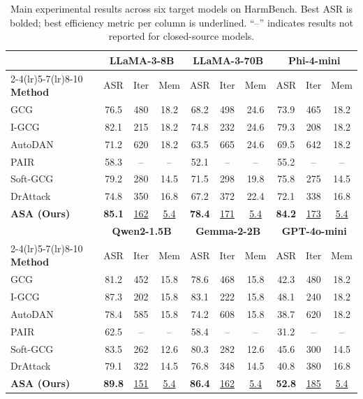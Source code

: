 ﻿\documentclass[lettersize,journal]{IEEEtran}
\begin{document}
\begin{table}[t]
\centering
\caption{Main experimental results across six target models on HarmBench. Best ASR is bolded; best efficiency metric per column is underlined. ``--'' indicates results not reported for closed-source models.}
\label{tab:main_results}
\begin{tabular}{l ccc ccc ccc}
\toprule
& \multicolumn{3}{c}{\textbf{LLaMA-3-8B}} & \multicolumn{3}{c}{\textbf{LLaMA-3-70B}} & \multicolumn{3}{c}{\textbf{Phi-4-mini}} \\
\cmidrule(lr){2-4}\cmidrule(lr){5-7}\cmidrule(lr){8-10}
\textbf{Method} & ASR & Iter & Mem & ASR & Iter & Mem & ASR & Iter & Mem \\
\midrule
GCG & 76.5 & 480 & 18.2 & 68.2 & 498 & 24.6 & 73.9 & 465 & 18.2 \\
I-GCG & 82.1 & 215 & 18.2 & 74.8 & 232 & 24.6 & 79.3 & 208 & 18.2 \\
AutoDAN & 71.2 & 620 & 18.2 & 63.5 & 665 & 24.6 & 69.5 & 642 & 18.2 \\
PAIR & 58.3 & -- & -- & 52.1 & -- & -- & 55.2 & -- & -- \\
Soft-GCG & 79.2 & 280 & 14.5 & 71.5 & 298 & 19.8 & 75.8 & 275 & 14.5 \\
DrAttack & 74.8 & 350 & 16.8 & 67.2 & 372 & 22.4 & 72.1 & 338 & 16.8 \\
\rowcolor[gray]{0.9}
\textbf{ASA (Ours)} & \textbf{85.1} & \underline{162} & \underline{5.4} & \textbf{78.4} & \underline{171} & \underline{5.4} & \textbf{84.2} & \underline{173} & \underline{5.4} \\
\bottomrule

& \multicolumn{3}{c}{\textbf{Qwen2-1.5B}} & \multicolumn{3}{c}{\textbf{Gemma-2-2B}} & \multicolumn{3}{c}{\textbf{GPT-4o-mini}} \\
\cmidrule(lr){2-4}\cmidrule(lr){5-7}\cmidrule(lr){8-10}
\textbf{Method} & ASR & Iter & Mem & ASR & Iter & Mem & ASR & Iter & Mem \\
\midrule
GCG & 81.2 & 452 & 15.8 & 78.6 & 468 & 15.8 & 42.3 & 480 & 18.2 \\
I-GCG & 87.3 & 202 & 15.8 & 83.1 & 222 & 15.8 & 48.1 & 240 & 18.2 \\
AutoDAN & 78.4 & 585 & 15.8 & 74.2 & 608 & 15.8 & 38.7 & 620 & 18.2 \\
PAIR & 62.5 & -- & -- & 58.4 & -- & -- & 31.2 & -- & -- \\
Soft-GCG & 83.5 & 262 & 12.6 & 80.3 & 282 & 12.6 & 45.6 & 300 & 14.5 \\
DrAttack & 79.1 & 322 & 14.5 & 76.8 & 348 & 14.5 & 40.8 & 380 & 16.8 \\
\rowcolor[gray]{0.9}
\textbf{ASA (Ours)} & \textbf{89.8} & \underline{151} & \underline{5.4} & \textbf{86.4} & \underline{162} & \underline{5.4} & \textbf{52.8} & \underline{185} & \underline{5.4} \\
\bottomrule
\end{tabular}
\end{table}
\end{document}

